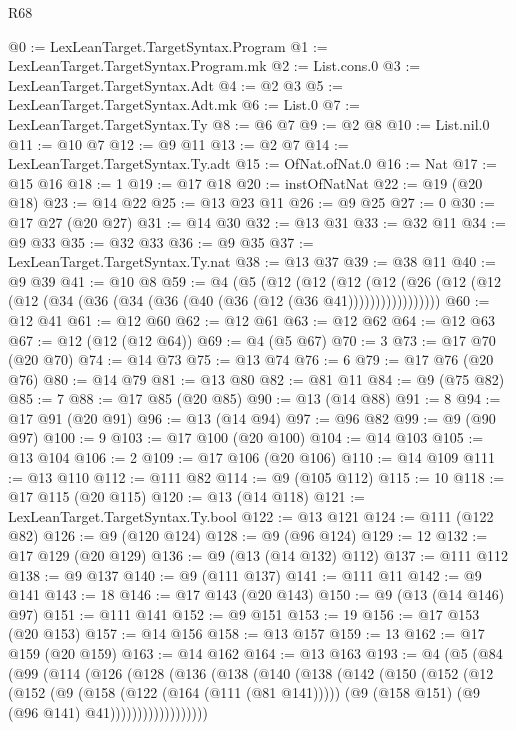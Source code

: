 \begin{lexlean}{R68}
\begin{coremodule}
@0 := LexLeanTarget.TargetSyntax.Program
@1 := LexLeanTarget.TargetSyntax.Program.mk
@2 := List.cons.{0}
@3 := LexLeanTarget.TargetSyntax.Adt
@4 := @2 @3
@5 := LexLeanTarget.TargetSyntax.Adt.mk
@6 := List.{0}
@7 := LexLeanTarget.TargetSyntax.Ty
@8 := @6 @7
@9 := @2 @8
@10 := List.nil.{0}
@11 := @10 @7
@12 := @9 @11
@13 := @2 @7
@14 := LexLeanTarget.TargetSyntax.Ty.adt
@15 := OfNat.ofNat.{0}
@16 := Nat
@17 := @15 @16
@18 := 1
@19 := @17 @18
@20 := instOfNatNat
@22 := @19 (@20 @18)
@23 := @14 @22
@25 := @13 @23 @11
@26 := @9 @25
@27 := 0
@30 := @17 @27 (@20 @27)
@31 := @14 @30
@32 := @13 @31
@33 := @32 @11
@34 := @9 @33
@35 := @32 @33
@36 := @9 @35
@37 := LexLeanTarget.TargetSyntax.Ty.nat
@38 := @13 @37
@39 := @38 @11
@40 := @9 @39
@41 := @10 @8
@59 := @4
    (@5
      (@12
        (@12
          (@12 (@12 (@26 (@12 (@12 (@12 (@34 (@36 (@34 (@36 (@40 (@36 (@12 (@36 @41)))))))))))))))))
@60 := @12 @41
@61 := @12 @60
@62 := @12 @61
@63 := @12 @62
@64 := @12 @63
@67 := @12 (@12 (@12 @64))
@69 := @4 (@5 @67)
@70 := 3
@73 := @17 @70 (@20 @70)
@74 := @14 @73
@75 := @13 @74
@76 := 6
@79 := @17 @76 (@20 @76)
@80 := @14 @79
@81 := @13 @80
@82 := @81 @11
@84 := @9 (@75 @82)
@85 := 7
@88 := @17 @85 (@20 @85)
@90 := @13 (@14 @88)
@91 := 8
@94 := @17 @91 (@20 @91)
@96 := @13 (@14 @94)
@97 := @96 @82
@99 := @9 (@90 @97)
@100 := 9
@103 := @17 @100 (@20 @100)
@104 := @14 @103
@105 := @13 @104
@106 := 2
@109 := @17 @106 (@20 @106)
@110 := @14 @109
@111 := @13 @110
@112 := @111 @82
@114 := @9 (@105 @112)
@115 := 10
@118 := @17 @115 (@20 @115)
@120 := @13 (@14 @118)
@121 := LexLeanTarget.TargetSyntax.Ty.bool
@122 := @13 @121
@124 := @111 (@122 @82)
@126 := @9 (@120 @124)
@128 := @9 (@96 @124)
@129 := 12
@132 := @17 @129 (@20 @129)
@136 := @9 (@13 (@14 @132) @112)
@137 := @111 @112
@138 := @9 @137
@140 := @9 (@111 @137)
@141 := @111 @11
@142 := @9 @141
@143 := 18
@146 := @17 @143 (@20 @143)
@150 := @9 (@13 (@14 @146) @97)
@151 := @111 @141
@152 := @9 @151
@153 := 19
@156 := @17 @153 (@20 @153)
@157 := @14 @156
@158 := @13 @157
@159 := 13
@162 := @17 @159 (@20 @159)
@163 := @14 @162
@164 := @13 @163
@193 := @4
    (@5
      (@84
        (@99
          (@114
            (@126
              (@128
                (@136
                  (@138
                    (@140
                      (@138
                        (@142
                          (@150
                            (@152
                              (@12
                                (@152
                                  (@9
                                    (@158 (@122 (@164 (@111 (@81 @141)))))
                                    (@9 (@158 @151) (@9 (@96 @141) @41))))))))))))))))))

\end{coremodule}
\end{lexlean}
